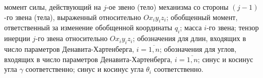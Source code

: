 \begin{itemize}
 момент силы, действующий на $j$-ое звено (тело) механизма со стороны ${(j-1)}$-го звена (тела), выраженный относительно $Ox_{i}y_{i}z_{i}$;
 обобщенный момент, ответственный за изменение обобщенной координаты $q_i$;
 масса $i$-го звена;
 тензор инерции $j$-го звена относительно $Ox_{i}y_{i}z_{i}$;
 обозначения для длин, входящих в число параметров Де\-на\-ви\-та-Хар\-тен\-бер\-га, $i=\overline{1,n}$;
 обозначения для углов, входящих в число параметров Де\-на\-ви\-та-Хар\-тен\-бер\-га, $i=\overline{1,n}$;
 синус и косинус угла $\gamma$ соответственно;
 синус и косинус угла $\theta_i$ соответственно.
\end{itemize}
\newpage
